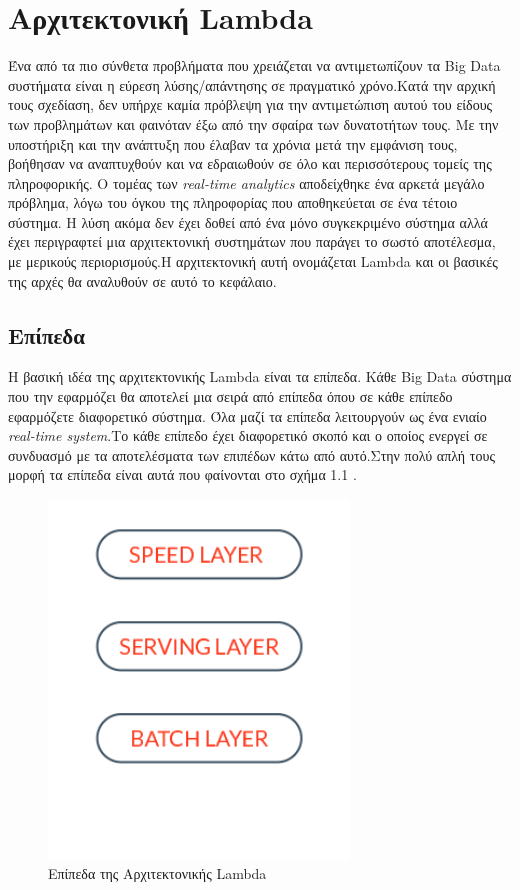 \chapter{Αρχιτεκτονική Lambda}
Ένα από τα πιο σύνθετα προβλήματα που χρειάζεται να αντιμετωπίζουν τα Big Data συστήματα είναι η εύρεση λύσης/απάντησης σε πραγματικό χρόνο.Κατά την αρχική τους σχεδίαση, δεν υπήρχε καμία πρόβλεψη για την αντιμετώπιση αυτού του είδους των προβλημάτων και φαινόταν έξω από την σφαίρα των δυνατοτήτων τους. Με την υποστήριξη και την ανάπτυξη που έλαβαν τα χρόνια μετά την εμφάνιση τους, βοήθησαν να αναπτυχθούν και να εδραιωθούν σε όλο και περισσότερους τομείς της πληροφορικής. Ο τομέας των \textit{real-time analytics} αποδείχθηκε ένα αρκετά μεγάλο πρόβλημα, λόγω του όγκου της πληροφορίας που αποθηκεύεται σε ένα τέτοιο σύστημα. Η λύση ακόμα δεν έχει δοθεί από ένα μόνο συγκεκριμένο σύστημα αλλά έχει περιγραφτεί μια αρχιτεκτονική συστημάτων που παράγει το σωστό αποτέλεσμα, με μερικούς περιορισμούς.Η αρχιτεκτονική αυτή ονομάζεται Lambda και οι βασικές της αρχές θα αναλυθούν σε αυτό το κεφάλαιο.

\section{Επίπεδα}
Η βασική ιδέα της αρχιτεκτονικής Lambda είναι τα επίπεδα. Κάθε Big Data σύστημα που την εφαρμόζει θα αποτελεί μια σειρά από επίπεδα όπου σε κάθε επίπεδο εφαρμόζετε διαφορετικό σύστημα. Όλα μαζί τα επίπεδα λειτουργούν ως ένα ενιαίο \textit{real-time system}.Το κάθε επίπεδο έχει διαφορετικό σκοπό και ο οποίος ενεργεί σε συνδυασμό με τα αποτελέσματα των επιπέδων κάτω από αυτό.Στην πολύ απλή τους μορφή τα επίπεδα είναι αυτά που φαίνονται στο σχήμα 1.1 .

\begin{figure}[t]
\caption{Επίπεδα της Αρχιτεκτονικής Lambda}
\includegraphics[width=8cm]{images/layers.png}
\centering
\end{figure}

